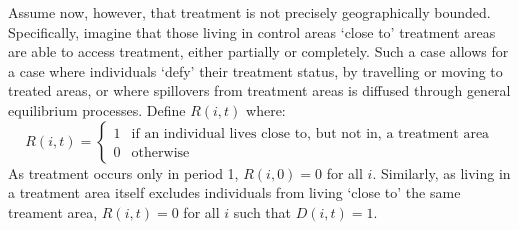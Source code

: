 Assume now, however, that treatment is not precisely geographically bounded.  
Specifically, imagine that those living in control areas `close to' treatment 
areas are able to access treatment, either partially or completely.  Such a 
case allows for a case where individuals `defy' their treatment status, by 
travelling or moving to treated areas, or where spillovers from treatment 
areas is diffused through general equilibrium processes.  Define $R(i,t)$ 
where:
\begin{equation}
\nonumber
 R(i,t) =
  \begin{cases}
   1   & \text{if an individual lives close to, but not in, a treatment area} \\
   0   & \text{otherwise} 
  \end{cases}
\end{equation}
As treatment occurs only in period 1, $R(i,0)=0$ for all $i$.  Similarly, as 
living in a treatment area itself excludes individuals from living `close to' 
the same treament area, $R(i,t)=0$ for all $i$ such that $D(i,t)=1$.

